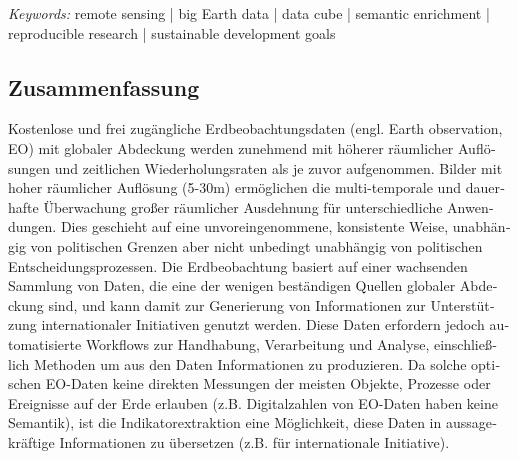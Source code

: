 \emph{Keywords:} remote sensing | big Earth data | data cube | semantic enrichment | reproducible research | sustainable development goals


\vfill



\begin{otherlanguage}{ngerman}
\clearpage
{}
\chapter*{Zusammenfassung}

\small
Kostenlose und frei zugängliche Erdbeobachtungsdaten (engl. Earth observation, \acs{EO}) mit globaler Abdeckung werden zunehmend mit höherer räumlicher Auflösungen und zeitlichen Wiederholungsraten als je zuvor aufgenommen. Bilder mit hoher räumlicher Auflösung (5-30\acs{m}) ermöglichen die multi-temporale und dauerhafte Überwachung großer räumlicher Ausdehnung für unterschiedliche Anwendungen. Dies geschieht auf eine unvoreingenommene, konsistente Weise, unabhängig von politischen Grenzen aber nicht unbedingt unabhängig von politischen Entscheidungsprozessen. Die Erdbeobachtung basiert auf einer wachsenden Sammlung von Daten, die eine der wenigen beständigen Quellen globaler Abdeckung sind, und kann damit zur Generierung von Informationen zur Unterstützung internationaler Initiativen genutzt werden. Diese Daten erfordern jedoch automatisierte Workflows zur Handhabung, Verarbeitung und Analyse, einschließlich Methoden um aus den Daten Informationen zu produzieren. Da solche optischen \acs{EO}-Daten keine direkten Messungen der meisten Objekte, Prozesse oder Ereignisse auf der Erde erlauben (z.B. Digitalzahlen von \acs{EO}-Daten haben keine Semantik), ist die Indikatorextraktion eine Möglichkeit, diese Daten in aussagekräftige Informationen zu übersetzen (z.B. für internationale Initiative).


\end{otherlanguage}
